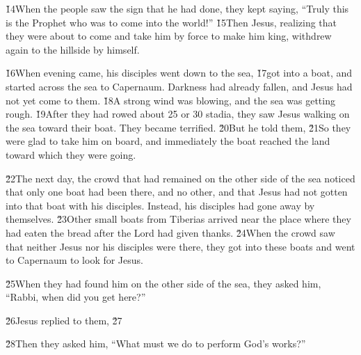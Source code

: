 \v{14}When the people saw the sign that he had done, they kept saying, ``Truly this is the Prophet who was to come into the world!'' \v{15}Then Jesus, realizing that they were about to come and take him by force to make him king, withdrew again to the hillside by himself.

\v{16}When evening came, his disciples went down to the sea, \v{17}got into a boat, and started across the sea to Capernaum. Darkness had already fallen, and Jesus had not yet come to them. \v{18}A strong wind was blowing, and the sea was getting rough. \v{19}After they had rowed about 25 or 30 stadia, they saw Jesus walking on the sea toward their boat. They became terrified. \v{20}But he told them,  \v{21}So they were glad to take him on board, and immediately the boat reached the land toward which they were going.

\v{22}The next day, the crowd that had remained on the other side of the sea noticed that only one boat had been there, and no other, and that Jesus had not gotten into that boat with his disciples. Instead, his disciples had gone away by themselves. \v{23}Other small boats from Tiberias arrived near the place where they had eaten the bread after the Lord had given thanks. \v{24}When the crowd saw that neither Jesus nor his disciples were there, they got into these boats and went to Capernaum to look for Jesus.

\v{25}When they had found him on the other side of the sea, they asked him, ``Rabbi, when did you get here?''

\v{26}Jesus replied to them,  \v{27}

\v{28}Then they asked him, ``What must we do to perform God's works?''

